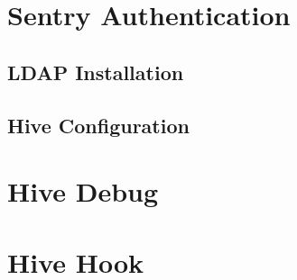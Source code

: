 \documentclass[11pt]{article}
\date{\today}
\title{}
\begin{document}
\tableofcontents

\section{Sentry Authentication}
\label{sec:orge633d17}
\subsection{LDAP Installation}
\label{sec:org361e2f3}
\subsection{Hive Configuration}
\label{sec:org97b1ffb}
\section{Hive Debug}
\label{sec:org6eacff1}
\section{Hive Hook}
\label{sec:org686d572}
\end{document}
